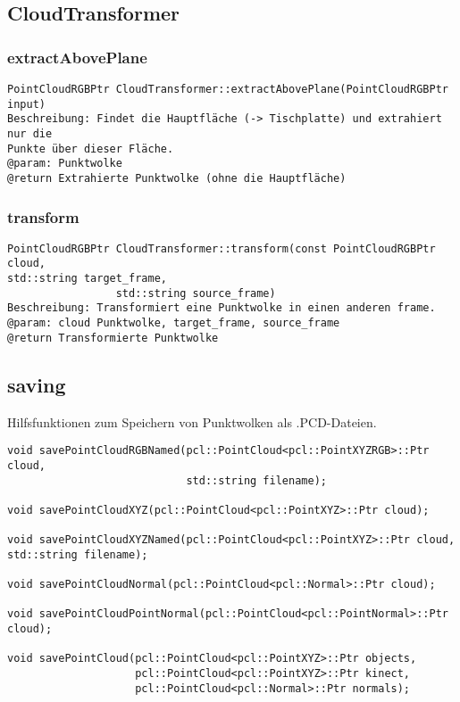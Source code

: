 \documentclass{suturo}
\begin{document}
\subsection*{CloudTransformer}

\subsubsection{extractAbovePlane}
\begin{verbatim}
PointCloudRGBPtr CloudTransformer::extractAbovePlane(PointCloudRGBPtr input)
Beschreibung: Findet die Hauptfläche (-> Tischplatte) und extrahiert nur die
Punkte über dieser Fläche.
@param: Punktwolke
@return Extrahierte Punktwolke (ohne die Hauptfläche)
\end{verbatim}\label{func:extractaboveplane}
\subsubsection{transform}
\begin{verbatim}
PointCloudRGBPtr CloudTransformer::transform(const PointCloudRGBPtr cloud,
std::string target_frame,
                 std::string source_frame)
Beschreibung: Transformiert eine Punktwolke in einen anderen frame.
@param: cloud Punktwolke, target_frame, source_frame
@return Transformierte Punktwolke
\end{verbatim}\label{func:transform}

\subsection*{saving}
Hilfsfunktionen zum Speichern von Punktwolken als .PCD-Dateien.

\begin{verbatim}
void savePointCloudRGBNamed(pcl::PointCloud<pcl::PointXYZRGB>::Ptr cloud,
                            std::string filename);
                            
void savePointCloudXYZ(pcl::PointCloud<pcl::PointXYZ>::Ptr cloud);

void savePointCloudXYZNamed(pcl::PointCloud<pcl::PointXYZ>::Ptr cloud,
std::string filename);

void savePointCloudNormal(pcl::PointCloud<pcl::Normal>::Ptr cloud);

void savePointCloudPointNormal(pcl::PointCloud<pcl::PointNormal>::Ptr cloud);

void savePointCloud(pcl::PointCloud<pcl::PointXYZ>::Ptr objects,
                    pcl::PointCloud<pcl::PointXYZ>::Ptr kinect,
                    pcl::PointCloud<pcl::Normal>::Ptr normals);
\end{verbatim}
\end{document}
